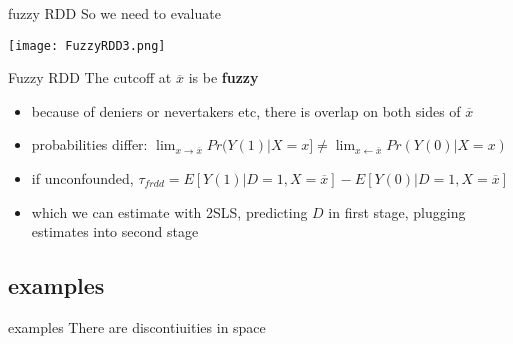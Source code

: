 \documentclass[aspectratio=169]{beamer}
\begin{document}
		\begin{frame}{fuzzy RDD}
			So we need to evaluate \\ \vspace*{.15cm}
			\begin{center}
				\texttt{[image: FuzzyRDD3.png]}
			\end{center}
		\end{frame}

		\begin{frame}{Fuzzy RDD}
			The cutcoff at $\overline{x}$ is be \textbf{fuzzy}
				\begin{itemize}
					\item<2-> because of deniers or nevertakers etc, there is overlap on both sides of $\overline{x}$
					\item<3-> probabilities differ: $\lim_{x \to \overline{x}} Pr(Y(1)|X=x] \neq \lim_{x \gets \overline{x}} Pr(Y(0)|X=x) $
				\end{itemize}
				\begin{center}
				\end{center}
				\begin{itemize}
					\item<4-> if unconfounded, $\tau_{frdd} = E[Y(1)|D=1, X=\overline{x}] -  E[Y(0)|D=1, X=\overline{x}] $
					\item<5>  which we can estimate with 2SLS, predicting $D$ in first stage, plugging estimates into second stage
				\end{itemize}
		\end{frame}


	\subsection{examples}

		\begin{frame}{examples}
			There are discontiuities in space
			\begin{center}
			\end{center}
		\end{frame}
\end{document}
